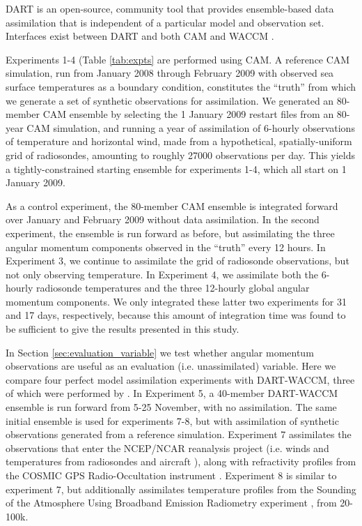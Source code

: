 DART \citep{Anderson2009} is an open-source, community tool that provides ensemble-based data assimilation that is independent of a particular model and observation set.
Interfaces exist between DART and both CAM \citep{Raeder2012} and WACCM \citep{Pedatella2013}.

Experiments 1-4 (Table \ref{tab:expts} are performed using CAM.  
A reference CAM simulation, run from January 2008 through February 2009 with observed sea surface temperatures as a boundary condition, constitutes the ``truth'' from which we generate a set of synthetic observations for assimilation. 
We generated an 80-member CAM ensemble by selecting the 1 January 2009 restart files from an 80-year CAM simulation, and running a year of assimilation of 6-hourly observations of temperature and horizontal wind, made from a hypothetical, spatially-uniform grid of radiosondes, amounting to roughly 27000 observations per day. 
This yields a tightly-constrained starting ensemble for experiments 1-4, which all start on 1 January 2009.

As a control experiment, the 80-member CAM ensemble is integrated forward over January and February 2009 without data assimilation. 
In the second experiment, the ensemble is run forward as before, but assimilating the three angular momentum components observed in the ``truth'' every 12 hours.
In Experiment 3, we continue to assimilate the grid of radiosonde observations, but not only observing temperature.
In Experiment 4, we assimilate both the 6-hourly radiosonde temperatures and the three 12-hourly global angular momentum components.
We only integrated these latter two experiments for 31 and 17 days, respectively, because this amount of integration time was found to be sufficient to give the results presented in this study.



In Section \ref{sec:evaluation_variable} we test whether angular momentum observations are useful as an evaluation (i.e. unassimilated) variable. 
Here we compare four perfect model assimilation experiments with DART-WACCM, three of which were performed by \citet{Pedatella2013}.  
In Experiment 5, a 40-member DART-WACCM ensemble is run forward from 5-25 November, with no assimilation. 
The same initial ensemble is used for experiments 7-8, but with assimilation of synthetic observations generated from a reference simulation. 
Experiment 7 assimilates the observations that enter the NCEP/NCAR reanalysis project (i.e. winds and temperatures from radiosondes and aircraft \citep{Saha2010}), along with refractivity profiles from the COSMIC GPS Radio-Occultation instrument \citep{Anthes2008}.
Experiment 8 is similar to experiment 7, but additionally assimilates temperature profiles from the Sounding of the Atmosphere Using Broadband Emission Radiometry experiment \citep[SABER]{Russell2009}, from 20-100k.

